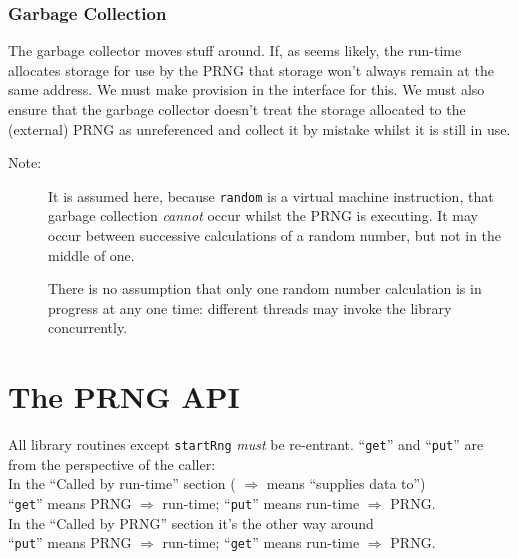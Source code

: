 \documentclass[letterpaper,12pt]{article}
\begin{document}
\subsubsection{Garbage Collection}
The garbage collector moves stuff around. If, as seems likely, the run-time
allocates storage for use by the PRNG that storage won't always remain at
the same address.  We must make provision in the interface for this. We
must also ensure that the garbage collector doesn't treat the storage
allocated to the (external) PRNG as unreferenced and collect it by mistake
whilst it is still in use.

\begin{description}
\item[Note:]
  It is assumed here, because \texttt{random} is a virtual machine
  instruction, that garbage collection {\em cannot} occur whilst the PRNG
  is executing. It may occur between successive calculations of a random
  number, but not in the middle of one.

  There is no assumption that only one random number calculation is in
  progress at any one time: different threads may invoke the library
  concurrently.
\end{description}

\section{The PRNG API}
All library routines except \texttt{startRng} {\em must} be re-entrant.
``\texttt{get}'' and ``\texttt{put}'' are from the perspective of the
caller:\\
In the ``Called by run-time'' section  ( $\Rightarrow$ means ``supplies data to'')\\
\indent
``\texttt{get}'' means PRNG $\Rightarrow$ run-time;
``\texttt{put}'' means run-time $\Rightarrow$ PRNG.\\
In the ``Called by PRNG'' section it's the other way around\\
\indent
``\texttt{put}'' means PRNG $\Rightarrow$ run-time;
``\texttt{get}'' means run-time $\Rightarrow$ PRNG.\\\\
\end{document}

